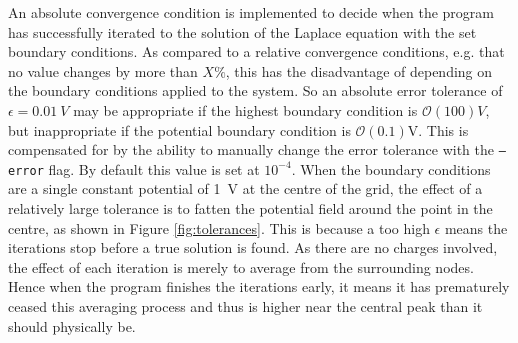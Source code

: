 An absolute convergence condition is implemented to decide when the program has successfully iterated to the solution of the Laplace equation with the set boundary conditions. As compared to a relative convergence conditions, e.g. that no value changes by more than $X\%$, this has the disadvantage of depending on the boundary conditions applied to the system. So an absolute error tolerance of $\epsilon = \SI{0.01}{V}$ may be appropriate if the highest boundary condition is $\mathcal{O}(100)\si{V}$, but inappropriate if the potential boundary condition is $\mathcal{O}(0.1)$\si{V}. This is compensated for by the ability to manually change the error tolerance with the \texttt{--error} flag. By default this value is set at $10^{-4}$. When the boundary conditions are a single constant potential of \SI{1}{V} at the centre of the grid, the effect of a relatively large tolerance is to fatten the potential field around the point in the centre, as shown in Figure \ref{fig:tolerances}. This is because a too high $\epsilon$ means the iterations stop before a true solution is found. As there are no charges involved, the effect of each iteration is merely to average from the surrounding nodes. Hence when the program finishes the iterations early, it means it has prematurely ceased this averaging process and thus is higher near the central peak than it should physically be. 

